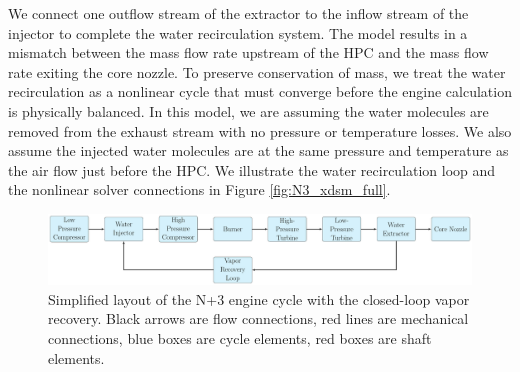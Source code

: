\documentclass[conf]{new-aiaa}
\begin{document}

We connect one outflow stream of the extractor to the inflow stream of the injector to complete the water recirculation system.
The model results in a mismatch between the mass flow rate upstream of the HPC and the mass flow rate exiting the core nozzle.
To preserve conservation of mass, we treat the water recirculation as a nonlinear cycle that must converge before the engine calculation is physically balanced.
In this model, we are assuming the water molecules are removed from the exhaust stream with no pressure or temperature losses.
We also assume the injected water molecules are at the same pressure and temperature as the air flow just before the HPC.
We illustrate the water recirculation loop and the nonlinear solver connections in Figure \ref{fig:N3_xdsm_full}.

\begin{figure}[hbt!]
    \centering
    \includegraphics[width=1.0\textwidth]{N3_CLVR_cycle.pdf}
    \caption{
        Simplified layout of the N+3 engine cycle with the closed-loop vapor recovery.
        Black arrows are flow connections, red lines are mechanical connections, blue boxes are cycle elements, red boxes are shaft elements.
    }
    \label{fig:n3_clvr}
\end{figure}
\end{document}
